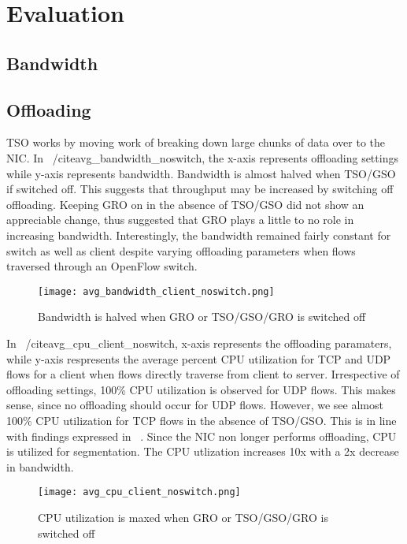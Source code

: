 \section{Evaluation} 
\subsection{Bandwidth} 

\subsection{Offloading} 
TSO works by moving work of breaking down large chunks of data over to the NIC.
In ~/cite{avg_bandwidth_noswitch}, the x-axis represents offloading settings
while y-axis represents bandwidth. Bandwidth is almost halved
when TSO/GSO if switched off. This suggests that throughput may be increased by
switching off offloading. Keeping GRO on in the absence of TSO/GSO did not show
an appreciable change, thus suggested that GRO plays a little to no role in
increasing bandwidth. Interestingly, the bandwidth remained fairly constant for
switch as well as client despite varying offloading parameters when flows
traversed through an OpenFlow switch. 
\begin{figure}[t]
\texttt{[image: avg\_bandwidth\_client\_noswitch.png]}
\caption{Bandwidth is halved when GRO or TSO/GSO/GRO is switched off}
\label{fig:avg_bandwidth_client_noswitch} \end{figure}


In ~/cite{avg_cpu_client_noswitch}, x-axis represents the offloading paramaters,
   while y-axis respresents the average percent CPU utilization for TCP and UDP
   flows for a client when flows directly traverse from client to server.
   Irrespective of offloading settings, 100\% CPU utilization is observed for
   UDP flows. This makes sense, since no offloading should occur for UDP flows.
   However, we see almost 100\% CPU utilization for TCP flows in the absence of
   TSO/GSO. This is in line with findings expressed in
   ~\cite{avg_bandwidth_client_noswitch}. Since the NIC non longer performs
   offloading, CPU is utilized for segmentation. The CPU utlization increases
   10x with a 2x decrease in bandwidth. 
\begin{figure}[t] \texttt{[image: avg\_cpu\_client\_noswitch.png]}
\caption{CPU utilization is maxed when GRO or TSO/GSO/GRO is switched off}
\label{fig:avg_cpu_client_noswitch} \end{figure}


